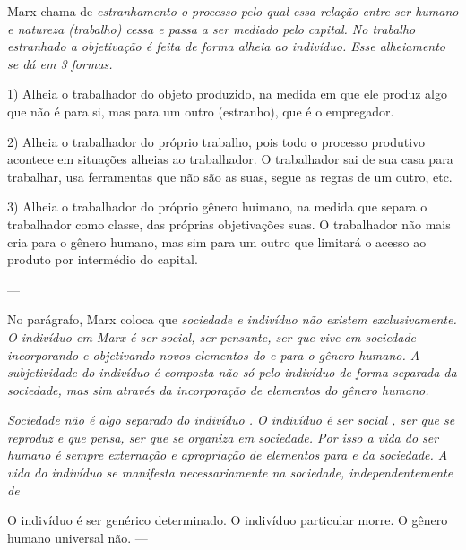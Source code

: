 \documentclass[12pt]{article}
\begin{document}
Marx chama de \em estranhamento \em o processo pelo qual essa relação entre ser humano e natureza (trabalho) cessa e passa a ser mediado pelo capital.
No \em trabalho estranhado \em a objetivação é feita de forma alheia ao indivíduo.
Esse alheiamento se dá em 3 formas.

1) Alheia o trabalhador do objeto produzido, na medida em que ele produz algo que não é para si, mas para um outro (estranho), que é o empregador.

2) Alheia o trabalhador do próprio trabalho, pois todo o processo produtivo acontece em situações alheias ao trabalhador.
O trabalhador sai de sua casa para trabalhar, usa ferramentas que não são as suas, segue as regras de um outro, etc.

3) Alheia o trabalhador do próprio gênero huimano, na medida que separa o trabalhador como classe, das próprias objetivações suas. O trabalhador não mais cria para o gênero humano, mas sim para um outro que limitará o acesso ao produto por intermédio do capital.


--- 


No parágrafo, Marx coloca que \em sociedade \em e \em indivíduo \em não existem exclusivamente.
O indivíduo em Marx é ser social, ser pensante, ser que vive em sociedade - incorporando e  objetivando novos elementos do e para o gênero humano.
A subjetividade do indivíduo é composta não só pelo indivíduo de forma separada da sociedade, mas sim através da incorporação de elementos do gênero humano.

\em Sociedade \em não é algo separado do \em indivíduo \em.
O indivíduo é \em ser social \em, ser que se reproduz e que pensa, ser que se organiza em sociedade.
Por isso a vida do ser humano é sempre externação e apropriação de elementos para e da sociedade.
A vida do indivíduo se manifesta necessariamente na sociedade, independentemente de 

O indivíduo é ser genérico determinado. O indivíduo particular morre. O gênero humano universal não.
---
\end{document}
